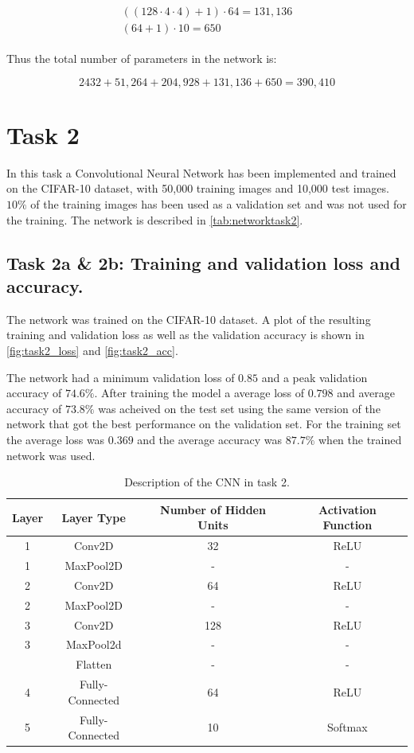 \documentclass{article}
\begin{document}
\begin{align}
\begin{split}
    ((128 \cdot 4 \cdot 4) +1) \cdot 64 = 131,136 \\
    (64+1) \cdot 10 = 650
\end{split}
\end{align}


Thus the total number of parameters in the network is:

\begin{equation}
    2432 + 51,264 + 204,928 + 131,136 + 650 = 390,410
\end{equation}


\section{Task 2}
In this task a Convolutional Neural Network has been implemented and trained on the CIFAR-10 dataset, with 50,000 training images and 10,000 test images. $10\%$ of the training images has been used as a validation set and was not used for the training. The network is described in \autoref{tab:networktask2}.

\subsection{Task 2a \& 2b: Training and validation loss and accuracy.}

The network was trained on the CIFAR-10 dataset. A plot of the resulting training and validation loss as well as the validation accuracy is shown in \autoref{fig:task2_loss} and \autoref{fig:task2_acc}.

The network had a minimum validation loss of $0.85$ and a peak validation accuracy of $74.6\%$. After training the model a average loss of $0.798$ and average accuracy of $73.8\%$ was acheived on the test set using the same version of the network that got the best performance on the validation set. For the training set the average loss was $0.369$ and the average accuracy was $87.7\%$ when the trained network was used. 

\begin{table}[H]
\centering
\caption{Description of the CNN in task 2.}
\label{tab:networktask2}
\begin{tabular}{c|c|c|c}
\textbf{Layer} & \textbf{Layer Type} & \textbf{Number of Hidden Units} & \textbf{Activation Function} \\ \hline
1 & Conv2D & 32 & ReLU \\
1 & MaxPool2D & - & - \\
2 & Conv2D & 64 & ReLU \\
2 & MaxPool2D & - & - \\
3 & Conv2D & 128 & ReLU \\
3 & MaxPool2d & - & - \\ \hline
 & Flatten & - & - \\
4 & Fully-Connected & 64 & ReLU \\
5 & Fully-Connected & 10 & Softmax
\end{tabular}
\end{table}
\end{document}
